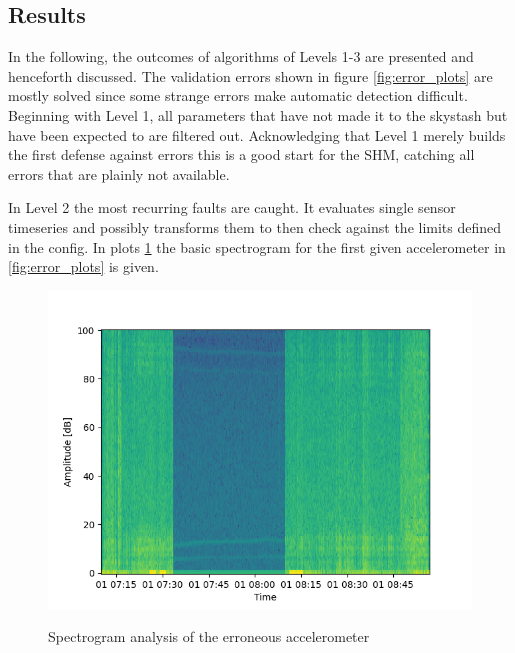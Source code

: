 \subsection{Results}


In the following, the outcomes of algorithms of Levels 1-3 are presented and henceforth discussed.
The validation errors shown in figure \ref{fig:error_plots} are mostly solved since some strange errors make automatic detection difficult.
Beginning with Level 1, all  parameters that have not made it to the skystash but have been expected to are filtered out. Acknowledging that Level 1 merely builds the first defense against errors this is a good start for the SHM, catching all errors that are plainly not available.

In Level 2 the most recurring faults are caught. It evaluates single sensor timeseries and possibly transforms them to then check against the limits defined in the config. In plots \ref{fig:results_050303_spectrogram} the basic spectrogram for the first given accelerometer in \ref{fig:error_plots} is given.

\begin{figure}
    \centering
    \includegraphics[width=.7\textwidth]{03_figures/python_functions/images/FUS_050303_spectro.png}
    \label{fig:results_050303_spectrogram}
    \caption{Spectrogram analysis of the erroneous accelerometer}
\end{figure}

